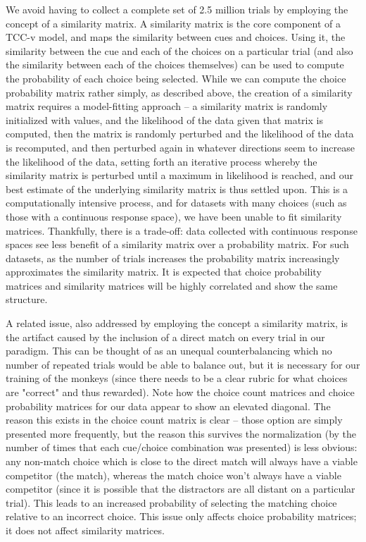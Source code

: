 \documentclass[9pt,biorxiv,lineno,onehalfspacing]{lapreprint}
\begin{document}
\begin{refsection}
We avoid having to collect a complete set of 2.5 million trials by employing the concept of a similarity matrix.
A similarity matrix is the core component of a TCC-v model, and maps the similarity between cues and choices. 
Using it, the similarity between the cue and each of the choices on a particular trial (and also the similarity between each of the choices themselves) can be used to compute the probability of each choice being selected.
While we can compute the choice probability matrix rather simply, as described above, the creation of a similarity matrix requires a model-fitting approach – a similarity matrix is randomly initialized with values, and the likelihood of the data given that matrix is computed, then the matrix is randomly perturbed and the likelihood of the data is recomputed, and then perturbed again in whatever directions seem to increase the likelihood of the data, setting forth an iterative process whereby the similarity matrix is perturbed until a maximum in likelihood is reached, and our best estimate of the underlying similarity matrix is thus settled upon.
This is a computationally intensive process, and for datasets with many choices (such as those with a continuous response space), we have been unable to fit similarity matrices. 
Thankfully, there is a trade-off: data collected with continuous response spaces see less benefit of a similarity matrix over a probability matrix. 
For such datasets, as the number of trials increases the probability matrix increasingly approximates the similarity matrix.
It is expected that choice probability matrices and similarity matrices will be highly correlated and show the same structure.

A related issue, also addressed by employing the concept a similarity matrix, is the artifact caused by the inclusion of a direct match on every trial in our paradigm. 
This can be thought of as an unequal counterbalancing which no number of repeated trials would be able to balance out, but it is necessary for our training of the monkeys (since there needs to be a clear rubric for what choices are "correct" and thus rewarded).
Note how the choice count matrices and choice probability matrices for our data appear to show an elevated diagonal. 
The reason this exists in the choice count matrix is clear – those option are simply presented more frequently, but the reason this survives the normalization (by the number of times that each cue/choice combination was presented) is less obvious: any non-match choice which is close to the direct match will always have a viable competitor (the match), whereas the match choice won't always have a viable competitor (since it is possible that the distractors are all distant on a particular trial).
This leads to an increased probability of selecting the matching choice relative to an incorrect choice. This issue only affects choice probability matrices; it does not affect similarity matrices.


\end{refsection}
\end{document}
